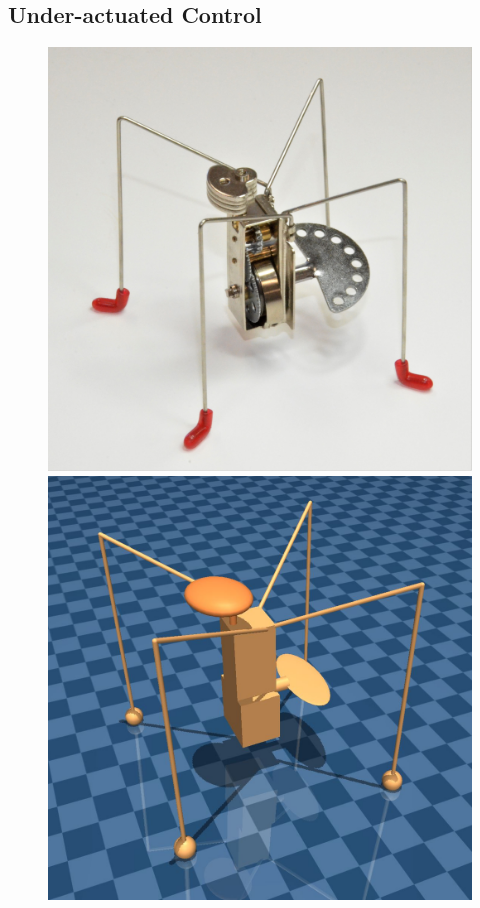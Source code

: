 \documentclass[letterpaper, 10 pt, conference]{ieeeconf}
\begin{document}
\subsection{Under-actuated Control}

\begin{figure}[ht]
    
    \centering
    
    \begin{minipage}[b]{0.49\linewidth}
        \centering
        \includegraphics[width=\linewidth]{katita}
    \end{minipage}
    \begin{minipage}[b]{0.49\linewidth}
        \centering
        \includegraphics[width=\linewidth]{jitterbug}
    \end{minipage}
    

\end{figure}
\end{document}
